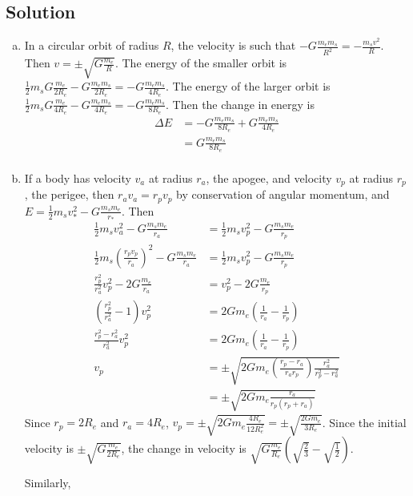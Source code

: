 \documentclass[solutions]{esg8012pset}
\begin{document}
\begin{solution}
\subsection{Solution}
\begin{enumerate}[(a)]
  \item In a circular orbit of radius $R$, the velocity is such that $-G\frac{m_e m_s}{R^2} = -\frac{m_s v^2}{R}$.  Then $v = \pm \sqrt{G\frac{m_e}{R}}$.  The energy of the smaller orbit is $\frac{1}{2} m_s G\frac{m_e}{2R_e} - G\frac{m_e m_s}{2R_e} = -G\frac{m_e m_s}{4R_e}$.  The energy of the larger orbit is $\frac{1}{2} m_s G\frac{m_e}{4R_e} - G\frac{m_e m_s}{4R_e} = -G\frac{m_e m_s}{8R_e}$.  Then the change in energy is \begin{align*}
 \Delta E & = -G\frac{m_e m_s}{8R_e} + G\frac{m_e m_s}{4R_e} \\
 & = G\frac{m_e m_s}{8R_e} \\
\end{align*}
  \item If a body has velocity $v_a$ at radius $r_a$, the apogee, and velocity $v_p$ at radius $r_p$, the perigee, then $r_a v_a = r_p v_p$ by conservation of angular momentum, and $E = \frac{1}{2} m_s v_*^2 - G\frac{m_s m_e}{r_*}$.  Then \begin{align*}
 \frac{1}{2} m_s v_a^2 - G\frac{m_s m_e}{r_a} & = \frac{1}{2} m_s v_p^2 - G\frac{m_s m_e}{r_p} \\
 \frac{1}{2} m_s \left(\frac{r_p v_p}{r_a}\right)^2 - G\frac{m_s m_e}{r_a} & = \frac{1}{2} m_s v_p^2 - G\frac{m_s m_e}{r_p} \\
 \frac{r_p^2}{r_a^2} v_p^2 - 2G\frac{m_e}{r_a} & = v_p^2 - 2G\frac{m_e}{r_p} \\
 \left(\frac{r_p^2}{r_a^2} - 1\right) v_p^2 & = 2Gm_e\left(\frac{1}{r_a} - \frac{1}{r_p}\right) \\
 \frac{r_p^2 - r_a^2}{r_a^2} v_p^2  & = 2Gm_e\left(\frac{1}{r_a} - \frac{1}{r_p}\right) \\
 v_p  & = \pm\sqrt{2Gm_e\left(\frac{r_p - r_a}{r_a r_p}\right)\frac{r_a^2}{r_p^2 - r_a^2}} \\
   & = \pm\sqrt{2Gm_e\frac{r_a}{r_p(r_p + r_a)}}
\end{align*}  Since $r_p = 2R_e$ and $r_a = 4R_e$, $v_p = \pm\sqrt{2Gm_e\frac{4R_e}{12R_e^2}} = \pm\sqrt{\frac{2G m_e}{3R_e}}$.  Since the initial velocity is $\pm \sqrt{G\frac{m_e}{2R_e}}$, the change in velocity is $\sqrt{G\frac{m_e}{R_e}}\left(\sqrt{\frac{2}{3}} - \sqrt{\frac{1}{2}}\right)$. \par
Similarly, \begin{align*}

\end{align*}
\end{enumerate}
\end{solution}
\end{document}
